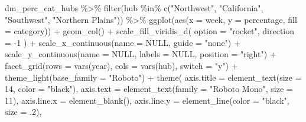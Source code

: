 \documentclass[
]{book}
\newenvironment{Shaded}{\begin{snugshade}}{\end{snugshade}}
\newcommand{\AttributeTok}[1]{\textcolor[rgb]{0.77,0.63,0.00}{#1}}
\newcommand{\ConstantTok}[1]{\textcolor[rgb]{0.00,0.00,0.00}{#1}}
\newcommand{\DecValTok}[1]{\textcolor[rgb]{0.00,0.00,0.81}{#1}}
\newcommand{\FunctionTok}[1]{\textcolor[rgb]{0.00,0.00,0.00}{#1}}
\newcommand{\NormalTok}[1]{#1}
\newcommand{\SpecialCharTok}[1]{\textcolor[rgb]{0.00,0.00,0.00}{#1}}
\newcommand{\StringTok}[1]{\textcolor[rgb]{0.31,0.60,0.02}{#1}}
\begin{document}
\begin{Shaded}
\begin{Highlighting}[]
\NormalTok{dm\_perc\_cat\_hubs }\SpecialCharTok{\%\textgreater{}\%}
  \FunctionTok{filter}\NormalTok{(hub }\SpecialCharTok{\%in\%} \FunctionTok{c}\NormalTok{(}\StringTok{"Northwest"}\NormalTok{, }
                    \StringTok{"California"}\NormalTok{, }
                    \StringTok{"Southwest"}\NormalTok{, }
                    \StringTok{"Northern Plains"}\NormalTok{)) }\SpecialCharTok{\%\textgreater{}\%}
  \FunctionTok{ggplot}\NormalTok{(}\FunctionTok{aes}\NormalTok{(}\AttributeTok{x =}\NormalTok{ week, }
             \AttributeTok{y =}\NormalTok{ percentage,}
             \AttributeTok{fill =}\NormalTok{ category)) }\SpecialCharTok{+}
  \FunctionTok{geom\_col}\NormalTok{() }\SpecialCharTok{+}
  \FunctionTok{scale\_fill\_viridis\_d}\NormalTok{(}
    \AttributeTok{option =} \StringTok{"rocket"}\NormalTok{,}
    \AttributeTok{direction =} \SpecialCharTok{{-}}\DecValTok{1}
\NormalTok{  ) }\SpecialCharTok{+}
  \FunctionTok{scale\_x\_continuous}\NormalTok{(}\AttributeTok{name =} \ConstantTok{NULL}\NormalTok{, }
                     \AttributeTok{guide =} \StringTok{"none"}\NormalTok{) }\SpecialCharTok{+}
  \FunctionTok{scale\_y\_continuous}\NormalTok{(}\AttributeTok{name =} \ConstantTok{NULL}\NormalTok{, }
                     \AttributeTok{labels =} \ConstantTok{NULL}\NormalTok{, }
                     \AttributeTok{position =} \StringTok{"right"}\NormalTok{) }\SpecialCharTok{+}
  \FunctionTok{facet\_grid}\NormalTok{(}\AttributeTok{rows =} \FunctionTok{vars}\NormalTok{(year), }
             \AttributeTok{cols =} \FunctionTok{vars}\NormalTok{(hub), }
             \AttributeTok{switch =} \StringTok{"y"}\NormalTok{) }\SpecialCharTok{+}
  \FunctionTok{theme\_light}\NormalTok{(}\AttributeTok{base\_family =} \StringTok{"Roboto"}\NormalTok{) }\SpecialCharTok{+}
  \FunctionTok{theme}\NormalTok{(}
    \AttributeTok{axis.title =} \FunctionTok{element\_text}\NormalTok{(}\AttributeTok{size =} \DecValTok{14}\NormalTok{, }
                              \AttributeTok{color =} \StringTok{"black"}\NormalTok{),}
    \AttributeTok{axis.text =} \FunctionTok{element\_text}\NormalTok{(}\AttributeTok{family =} \StringTok{"Roboto Mono"}\NormalTok{, }
                             \AttributeTok{size =} \DecValTok{11}\NormalTok{),}
    \AttributeTok{axis.line.x =} \FunctionTok{element\_blank}\NormalTok{(),}
    \AttributeTok{axis.line.y =} \FunctionTok{element\_line}\NormalTok{(}\AttributeTok{color =} \StringTok{"black"}\NormalTok{, }
                               \AttributeTok{size =}\NormalTok{ .}\DecValTok{2}\NormalTok{),}

\end{Highlighting}
\end{Shaded}
\end{document}
